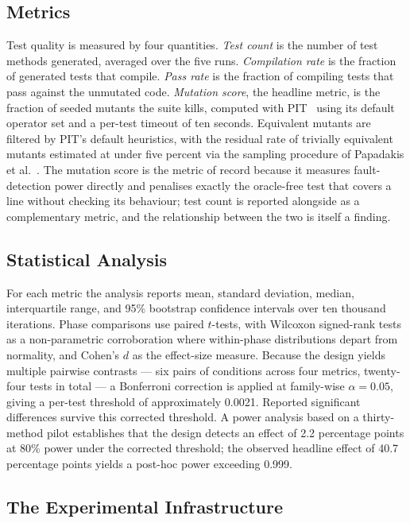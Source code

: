 \subsection{Metrics}

Test quality is measured by four quantities. \emph{Test count} is the number of
test methods generated, averaged over the five runs. \emph{Compilation rate} is
the fraction of generated tests that compile. \emph{Pass rate} is the fraction
of compiling tests that pass against the unmutated code. \emph{Mutation score},
the headline metric, is the fraction of seeded mutants the suite kills, computed
with PIT~\cite{coles2016pitest} using its default operator set and a per-test
timeout of ten seconds. Equivalent mutants are filtered by PIT's default
heuristics, with the residual rate of trivially equivalent mutants estimated at
under five percent via the sampling procedure of Papadakis et
al.~\cite{papadakis2019mutation}. The mutation score is the metric of record
because it measures fault-detection power directly and penalises exactly the
oracle-free test that covers a line without checking its behaviour; test count
is reported alongside as a complementary metric, and the relationship between
the two is itself a finding.

\subsection{Statistical Analysis}

For each metric the analysis reports mean, standard deviation, median,
interquartile range, and 95\% bootstrap confidence intervals over ten thousand
iterations. Phase comparisons use paired $t$-tests, with Wilcoxon signed-rank
tests as a non-parametric corroboration where within-phase distributions depart
from normality, and Cohen's $d$ as the effect-size measure. Because the design
yields multiple pairwise contrasts --- six pairs of conditions across four
metrics, twenty-four tests in total --- a Bonferroni correction is applied at
family-wise $\alpha = 0.05$, giving a per-test threshold of approximately
0.0021. Reported significant differences survive this corrected threshold. A
power analysis based on a thirty-method pilot establishes that the design
detects an effect of 2.2 percentage points at 80\% power under the corrected
threshold; the observed headline effect of 40.7 percentage points yields a
post-hoc power exceeding 0.999.

\subsection{The Experimental Infrastructure}

